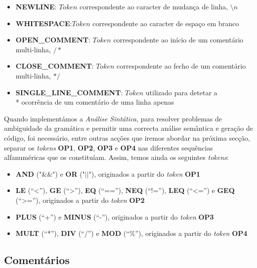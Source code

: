 \documentclass[11pt,a4paper]{article}
\begin{document}
	\begin{itemize}
	\item \textbf{NEWLINE}: $Token$ correspondente ao caracter de mudança de linha, $\setminus n$
	
	\item \textbf{WHITESPACE}:$Token$ correspondente ao caracter de espaço em branco
	
	\item \textbf{OPEN\_COMMENT}:  $Token$ correspondente ao início de um comentário multi-linha, $/*$
	
	\item \textbf{CLOSE\_COMMENT}: $Token$ correspondente ao fecho de um comentário multi-linha, $*/$
	
	\item \textbf{SINGLE\_LINE\_COMMENT}: $Token$ utilizado para detetar a \\* ocorrência de um comentário de uma linha apenas
	\end{itemize}
	
	Quando implementámos a \emph{Análise Sintática}, para resolver problemas de ambiguidade da gramática e permitir uma correcta análise semântica e geração de código, foi necessário, entre outras acções que iremos abordar na próxima secção, separar os \emph{tokens} \textbf{OP1}, \textbf{OP2}, \textbf{OP3} e \textbf{OP4} nas diferentes sequências alfanuméricas que os constituíam. Assim, temos ainda os seguintes \emph{tokens}:
	
	\begin{itemize}
	\item \textbf{AND} ("\&\&") e \textbf{OR} ("$||$"), originados a partir do \emph{token} \textbf{OP1}
	
	\item \textbf{LE} (``<''), \textbf{GE} (``>''), \textbf{EQ} (``==''), \textbf{NEQ} (``!=''), \textbf{LEQ} (``<='') e \textbf{GEQ} (``>=''), originados a partir do \emph{token} \textbf{OP2}
	
	\item \textbf{PLUS} (``+'') e \textbf {MINUS} (``-''), originados a partir do \emph{token} \textbf{OP3}
	
	\item \textbf{MULT} (``*''), \textbf{DIV} (``/'') e \textbf{MOD} (``\%''), originados a partir do \emph{token} \textbf{OP4}
	\end{itemize}
	
	\subsection{Comentários}
	
\end{document}
